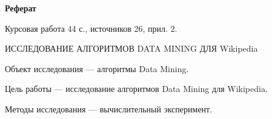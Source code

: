 \begin{center}
	\textbf{Реферат}
\end{center}

      Курсовая работа  44  с., источников  26, прил. 2.

ИССЛЕДОВАНИЕ АЛГОРИТМОВ DATA MINING ДЛЯ Wikipedia

Объект исследования --- алгоритмы Data Mining.
     
Цель работы --- исследование алгоритмов Data Mining для Wikipedia.

Методы исследования --- вычислительный эксперимент.
